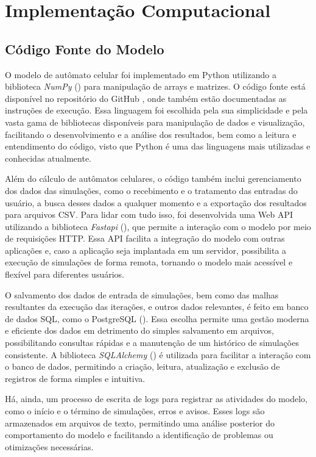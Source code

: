 \documentclass[12pt,oneside]{report}
\begin{document}
\section{Implementação Computacional}

\subsection{Código Fonte do Modelo}

O modelo de autômato celular foi implementado em Python utilizando a biblioteca \textit{NumPy} () para manipulação de arrays e matrizes. O código fonte está disponível no repositório do GitHub \textbf{}, onde também estão documentadas as instruções de execução. Essa linguagem foi escolhida pela sua simplicidade e pela vasta gama de bibliotecas disponíveis para manipulação de dados e visualização, facilitando o desenvolvimento e a análise dos resultados, bem como a leitura e entendimento do código, visto que Python é uma das linguagens mais utilizadas e conhecidas atualmente.

Além do cálculo de autômatos celulares, o código também inclui gerenciamento dos dados das simulações, como o recebimento e o tratamento das entradas do usuário, a busca desses dados a qualquer momento e a exportação dos resultados para arquivos CSV. Para lidar com tudo isso, foi desenvolvida uma Web API utilizando a biblioteca \textit{Fastapi} (), que permite a interação com o modelo por meio de requisições HTTP. Essa API facilita a integração do modelo com outras aplicações e, caso a aplicação seja implantada em um servidor, possibilita a execução de simulações de forma remota, tornando o modelo mais acessível e flexível para diferentes usuários.

O salvamento dos dados de entrada de simulações, bem como das malhas resultantes da execução das iterações, e outros dados relevantes, é feito em banco de dados SQL, como o PostgreSQL (). Essa escolha permite uma gestão moderna e eficiente dos dados em detrimento do simples salvamento em arquivos, possibilitando consultas rápidas e a manutenção de um histórico de simulações consistente. A biblioteca \textit{SQLAlchemy} () é utilizada para facilitar a interação com o banco de dados, permitindo a criação, leitura, atualização e exclusão de registros de forma simples e intuitiva.

Há, ainda, um processo de escrita de logs para registrar as atividades do modelo, como o início e o término de simulações, erros e avisos. Esses logs são armazenados em arquivos de texto, permitindo uma análise posterior do comportamento do modelo e facilitando a identificação de problemas ou otimizações necessárias.
\end{document}
